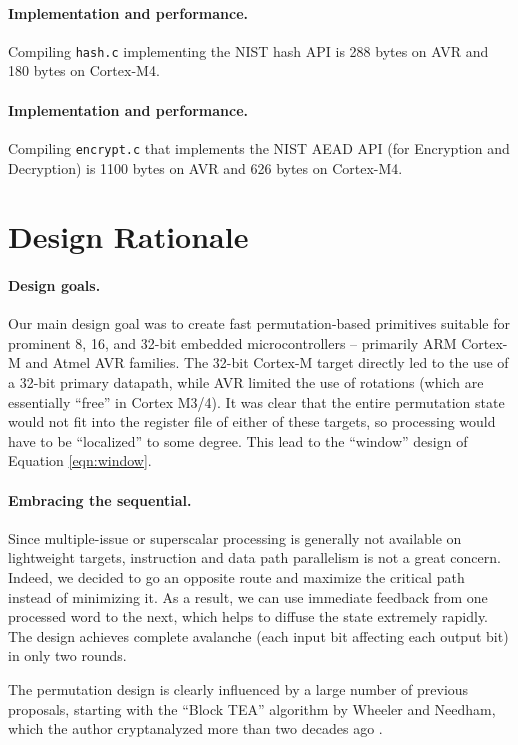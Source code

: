 \documentclass{iacrtrans}
\begin{document}
	\paragraph{Implementation and performance.}
	Compiling \verb|hash.c| implementing the NIST hash API is 288 bytes on AVR
	and 180 bytes on Cortex-M4.

	\paragraph{Implementation and performance.}
	Compiling \verb|encrypt.c| that implements the NIST AEAD API (for 
	Encryption and Decryption) is 1100 bytes on AVR and 626 bytes on Cortex-M4.


\section{Design Rationale}

	\paragraph{Design goals.}
	Our main design goal was to create fast permutation-based primitives
	suitable for prominent 8, 16, and 32-bit embedded microcontrollers -- 
	primarily ARM Cortex-M and Atmel AVR families. The 32-bit Cortex-M 
	target directly led to the use of a 32-bit primary datapath, while AVR 
	limited the use of rotations (which are essentially ``free'' in Cortex 
	M3/4). It was clear that the entire permutation state would not fit into
	the register file of either of these targets, so processing would
	have to be ``localized'' to some degree. This lead to the ``window''
	design of Equation \ref{eqn:window}.

	\paragraph{Embracing the sequential.}
	Since multiple-issue or superscalar processing is generally not available
	on lightweight targets, instruction and data path parallelism is 
	not a great concern. Indeed, we decided to go an opposite route and
	maximize the critical path instead of minimizing it. 
	As a result, we can use immediate feedback from one processed 
	word to the next, which helps to diffuse the state extremely rapidly.
	The design achieves complete avalanche (each input bit affecting
	each output bit) in only two rounds.
	
	The permutation design is clearly influenced by a large number of 
	previous proposals, starting with the ``Block TEA'' algorithm by Wheeler 
	and Needham, which the author cryptanalyzed more than two decades ago 
	\cite{xxtea}. 
\end{document}
